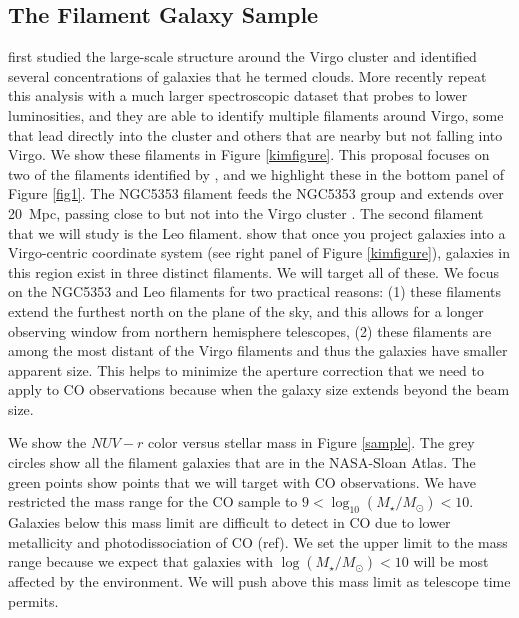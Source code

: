 \documentclass[12pt, preprint]{aastex}
\begin{document}
\vspace*{-1cm}\subsection{The Filament Galaxy Sample} 
\vspace*{-.4cm}
\citet{tully82} first studied the large-scale structure around the Virgo
cluster and identified several concentrations of galaxies that he
termed clouds.  More recently \citet{kim16} repeat this analysis with
a much larger spectroscopic dataset that probes to lower luminosities,
and they are able to identify multiple
filaments around Virgo, some that lead directly into the cluster and
others that are nearby but not falling into Virgo.  We show these
filaments in Figure \ref{kimfigure}.
This proposal focuses on two of the filaments identified by
\citet{kim16}, and we highlight these in the bottom panel of Figure
\ref{fig1}.  The NGC5353 filament feeds the NGC5353 group and extends over 20~Mpc,
passing close to but not into the Virgo cluster \citep{kim16}.  The second filament
that we will study is the Leo filament.  \citet{kim16} show that once
you project galaxies into a Virgo-centric coordinate system (see right
panel of Figure \ref{kimfigure}), galaxies
in this region exist in three distinct filaments.  We will target all
of these.  We focus on
the NGC5353 and Leo filaments for two practical reasons:  (1) these filaments
extend the furthest north on the plane of the sky, and this allows
for a longer observing window from northern hemisphere telescopes, (2)
these filaments are among the most distant of the Virgo filaments and
thus the galaxies have smaller apparent size.  This helps to minimize
the aperture correction that we need to apply to CO observations
because when the galaxy size extends beyond the beam size.  






We show the $NUV-r$ color versus stellar mass in Figure \ref{sample}.
The grey circles show all the filament galaxies that are in the
NASA-Sloan Atlas.  The green points show points
that we will target with CO observations.  We have restricted the mass
range for the CO sample to $9 < \log_{10} (M_\star/M_\odot) < 10$.
Galaxies below this mass limit are difficult to detect in CO due
to lower metallicity and photodissociation of CO (ref).  We set the
upper limit to the mass range because we expect that galaxies with
$\log (M_\star/M_\odot) < 10$ will be most affected by the
environment.  We will push above this mass limit as telescope time
permits.
\end{document}
